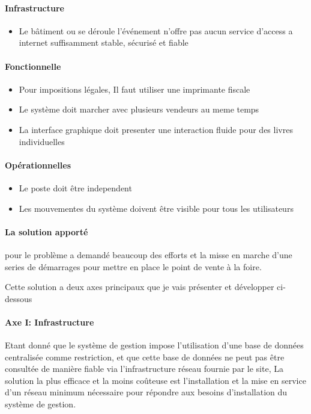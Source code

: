 \documentclass{resume} %
\begin{document}
		\paragraph{Infrastructure}
		\begin {itemize} 
			\item Le bâtiment ou se déroule l'événement n'offre pas aucun service d'access a internet suffisamment stable, sécurisé et fiable
		\end {itemize}
		\paragraph{Fonctionnelle}
		\begin {itemize} 
			\item Pour impositions légales, Il faut utiliser une imprimante fiscale 
			\item Le système doit marcher avec plusieurs vendeurs au meme temps
			\item La interface graphique doit presenter une interaction fluide pour des livres individuelles 
		\end {itemize}
		\paragraph{Opérationnelles}
		\begin {itemize} 
			\item Le poste doit être independent 
			\item Les mouvementes du système doivent être visible pour tous les utilisateurs
		\end {itemize}		
		
		
		
	   \paragraph{La solution apporté} pour le problème a demandé beaucoup des efforts et la misse en marche d'une series de démarrages pour mettre en place le point de vente à la foire.
	   
	       Cette solution a deux axes principaux que je vais présenter et développer ci-dessous
	   
	  	        
		\paragraph{Axe I: Infrastructure}
			Etant donné que le système de gestion impose l'utilisation d'une base de données centralisée comme restriction, et que cette base de données ne peut pas être consultée de manière fiable via l'infrastructure réseau fournie par le site,
La solution la plus efficace et la moins coûteuse est l'installation et la mise en service d'un réseau minimum nécessaire pour répondre aux besoins d'installation du système de gestion.
\end{document}
